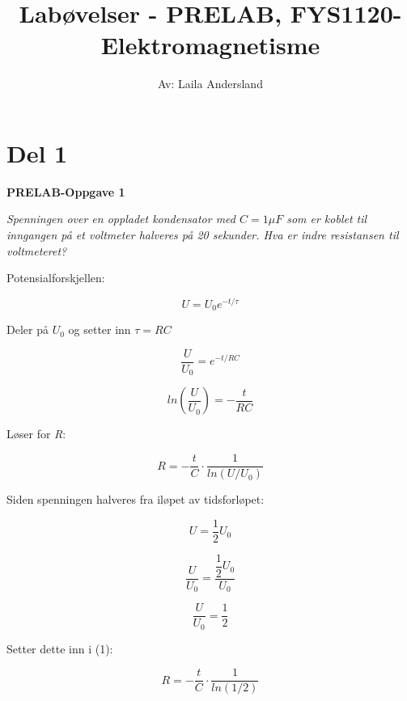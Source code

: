 \documentclass[a4paper,norsk,12pt]{article}
\title{\vspace{-4.0cm} \textbf{Labøvelser - PRELAB, FYS1120-Elektromagnetisme}}
\author{Av: Laila Andersland}
\begin{document}
\maketitle



\section*{Del 1} 

\textbf{PRELAB-Oppgave 1} 

\noindent
\textit{Spenningen over en oppladet kondensator med $ C=1 \mu F$ som er koblet til inngangen på et voltmeter halveres på 20 sekunder. Hva er indre resistansen til voltmeteret?}

\vspace{3mm}

Potensialforskjellen:

$$U = U_0 e^{-t/ \tau}$$

Deler på $U_0$ og setter inn $\tau=RC$

$$ \dfrac{U}{U_0} = e^{-t/RC} $$


$$ ln (\dfrac{U}{U_0}) = -\dfrac{t}{RC} $$ 

Løser for \textit{R}:

\begin{equation}
R =  - \dfrac{t}{C} \cdot \dfrac{1}{ln ({U}/{U_0}) }
\end{equation}

Siden spenningen halveres fra iløpet av tidsforløpet:

$$ U = \dfrac{1}{2} U_0 $$

$$ \dfrac{U}{U_0} = \dfrac{\dfrac{1}{2} U_0}{U_0} $$

$$ \dfrac{U}{U_0} = \dfrac{1}{2} $$

Setter dette inn i (1):

$$ R =  - \dfrac{t}{C} \cdot \dfrac{1}{ln ({1}/{2}) } $$
\end{document}
